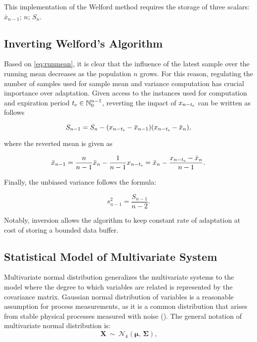 This implementation of the Welford method requires the storage of three scalars: \(\bar x_{n-1}\); \(n\); \(S_n\).

\subsection{Inverting Welford's Algorithm}\label{AA:InvWelford}
Based on \eqref{eq:runmean}, it is clear that the influence of the latest sample over the running mean decreases as the population \(n\) grows. For this reason, regulating the number of samples used for sample mean and variance computation has crucial importance over adaptation. Given access to the instances used for computation and expiration period \(t _{\text{e}} \in \mathbb{N}_{0}^{n-1}\), reverting the impact of \(x_{n-t _{\text{e}}}\) can be written as follows

\begin{equation}
S_{n-1} = S_n - (x_{n-t _{\text{e}}} - \bar x_{n-1})(x_{n-t _{\text{e}}} - \bar x_n)\text{,}\label{eq:revrunmean}
\end{equation}

where the reverted mean is given as

\begin{equation}
\bar x_{n-1} = \frac{n}{n-1} \bar x_{n} - \frac{1}{n-1}x_{n-t _{\text{e}}} = \bar x_{n} - \frac{x_{n-t _{\text{e}}} - \bar x_{n}}{n-1}\text{.}\label{eq:revmean}
\end{equation}


Finally, the unbiased variance follows the formula:

\begin{equation}
s^2_{n-1} = \frac{S_{n-1}}{n-2}\text{.}\label{eq:revvar}
\end{equation}

Notably, inversion allows the algorithm to keep constant rate of adaptation at cost of storing a bounded data buffer.

\subsection{Statistical Model of Multivariate System}\label{AA:Distribution}
Multivariate normal distribution generalizes the multivariate systems to the model where the degree to which variables are related is represented by the covariance matrix. Gaussian normal distribution of variables is a reasonable assumption for process measurements, as it is a common distribution that arises from stable physical processes measured with noise (\cite{Mishra201831}). The general notation of multivariate normal distribution is:
\begin{equation}
 \mathbf{X}\ \sim\ \mathcal{N}_k(\boldsymbol\mu,\, \boldsymbol\Sigma)\text{,}\label{eq:distribution}
\end{equation}

